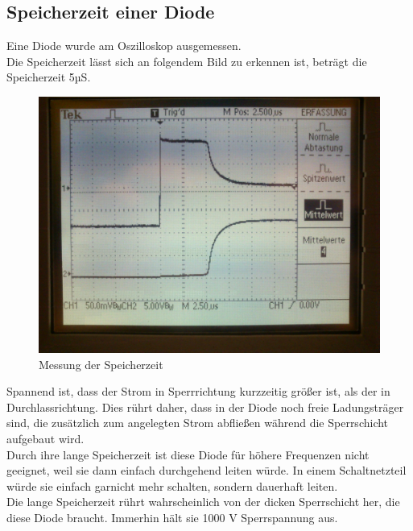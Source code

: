 \subsection{Speicherzeit einer Diode}
Eine Diode wurde am Oszilloskop ausgemessen.\\
Die Speicherzeit lässt sich an folgendem Bild zu erkennen ist, beträgt die Speicherzeit 5µS.
\begin{figure}[H]
	\centering
	\includegraphics[width=\linewidth]{versuch2/oszi/DSC_0230.JPG}
	\caption{Messung der Speicherzeit}
\end{figure}
Spannend ist, dass der Strom in Sperrrichtung kurzzeitig größer ist, als der in Durchlassrichtung. Dies rührt daher, dass in der Diode noch freie Ladungsträger sind, die zusätzlich zum angelegten Strom abfließen während die Sperrschicht aufgebaut wird.\\
Durch ihre lange Speicherzeit ist diese Diode für höhere Frequenzen nicht geeignet, weil sie dann einfach durchgehend leiten würde. In einem Schaltnetzteil würde sie einfach garnicht mehr schalten, sondern dauerhaft leiten.\\
Die lange Speicherzeit rührt wahrscheinlich von der dicken Sperrschicht her, die diese Diode braucht. Immerhin hält sie 1000 V Sperrspannung aus.

